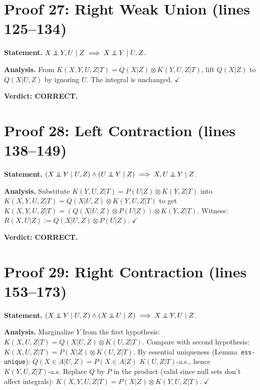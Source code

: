 \documentclass{article}
\begin{document}
\section{Proof 27: Right Weak Union (lines 125--134)}

\textbf{Statement.} $X\operatorname*{\perp\mkern-11mu\perp} Y,U\mid Z \implies X\operatorname*{\perp\mkern-11mu\perp} Y\mid U,Z$.

\textbf{Analysis.}
From $K(X,Y,U,Z|T)=Q(X|Z)\otimes K(Y,U,Z|T)$, lift $Q(X|Z)$ to $Q(X|U,Z)$
by ignoring $U$.  The integral is unchanged.  $\checkmark$

\textbf{Verdict: CORRECT.}

\section{Proof 28: Left Contraction (lines 138--149)}

\textbf{Statement.}
$(X\operatorname*{\perp\mkern-11mu\perp} Y\mid U,Z)\land(U\operatorname*{\perp\mkern-11mu\perp} Y\mid Z)\implies X,U\operatorname*{\perp\mkern-11mu\perp} Y\mid Z$.

\textbf{Analysis.}
Substitute $K(Y,U,Z|T)=P(U|Z)\otimes K(Y,Z|T)$ into
$K(X,Y,U,Z|T)=Q(X|U,Z)\otimes K(Y,U,Z|T)$ to get
$K(X,Y,U,Z|T)=(Q(X|U,Z)\otimes P(U|Z))\otimes K(Y,Z|T)$.
Witness: $R(X,U|Z):=Q(X|U,Z)\otimes P(U|Z)$.  $\checkmark$

\textbf{Verdict: CORRECT.}

\section{Proof 29: Right Contraction (lines 153--173)}

\textbf{Statement.}
$(X\operatorname*{\perp\mkern-11mu\perp} Y\mid U,Z)\land(X\operatorname*{\perp\mkern-11mu\perp} U\mid Z)\implies X\operatorname*{\perp\mkern-11mu\perp} Y,U\mid Z$.

\textbf{Analysis.}
Marginalize $Y$ from the first hypothesis:
$K(X,U,Z|T)=Q(X|U,Z)\otimes K(U,Z|T)$.
Compare with second hypothesis: $K(X,U,Z|T)=P(X|Z)\otimes K(U,Z|T)$.
By essential uniqueness (Lemma~\texttt{ess-unique}):
$Q(X\in A|U,Z)=P(X\in A|Z)$ $K(U,Z|T)$-a.s., hence $K(Y,U,Z|T)$-a.s.
Replace $Q$ by $P$ in the product (valid since null sets don't affect integrals):
$K(X,Y,U,Z|T)=P(X|Z)\otimes K(Y,U,Z|T)$.  $\checkmark$
\end{document}
